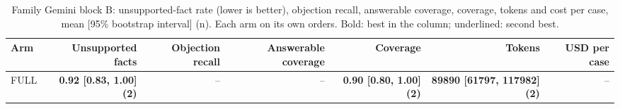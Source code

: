 \begin{table}[htbp]
\centering\footnotesize
\begin{adjustbox}{max width=\textwidth}
\begin{tabular}{@{}lrrrrrr@{}}
\toprule
Arm & Unsupported facts & Objection recall & Answerable coverage & Coverage & Tokens & USD per case \\
\midrule
FULL & \textbf{0.92 [0.83, 1.00] (2)} & -- & -- & \textbf{0.90 [0.80, 1.00] (2)} & \textbf{89890 [61797, 117982] (2)} & -- \\
\bottomrule
\end{tabular}
\end{adjustbox}
\caption{Family Gemini block B: unsupported-fact rate (lower is better), objection recall, answerable coverage, coverage, tokens and cost per case, mean [95\% bootstrap interval] (n). Each arm on its own orders. Bold: best in the column; underlined: second best.}
\label{tab:table1b_shravani_gem}
\end{table}